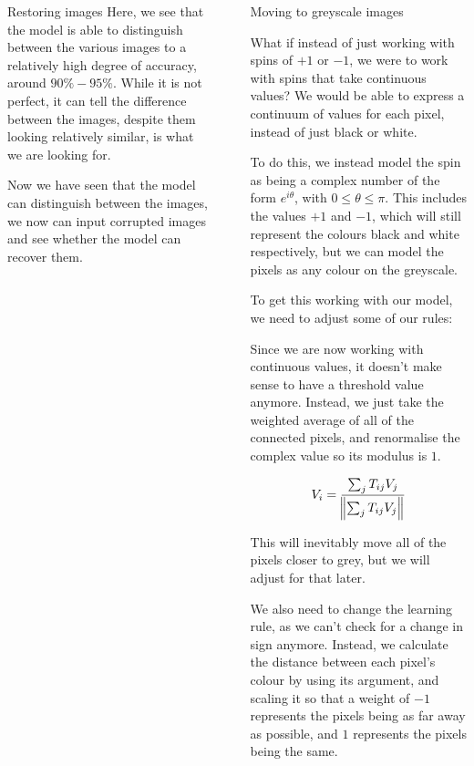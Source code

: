 \documentclass[25pt, a0paper, portrait]{beamer}
\newlength{\sepwidth}
\newlength{\colwidth}
\newcommand{\separatorcolumn}{\begin{column}{\sepwidth}\end{column}}
\begin{document}
\begin{frame}[t]
\begin{columns}[t]
\begin{column}{\colwidth}
\begin{block}{Restoring images}
    Here, we see that the model is able to distinguish between the various images to
    a relatively high degree of accuracy, around $90\% - 95\%$. While it is not perfect, it
    can tell the difference between the images, despite them looking relatively similar,
    is what we are looking for.

    Now we have seen that the model can distinguish between the images, we now can
    input corrupted images and see whether the model can recover them.

  \end{block}

\end{column}

\separatorcolumn

\begin{column}{\colwidth}

  \begin{block}{Moving to greyscale images} \small

    What if instead of just working with spins of $+1$ or $-1$, we were to work
    with spins that take continuous values? We would be able to express a continuum
    of values for each pixel, instead of just black or white.

    To do this, we instead model the spin as being a complex number of the form $e^{i\theta}$,
    with $0 \le \theta \le \pi$. This includes the values $+1$ and $-1$, which will still
    represent the colours black and white respectively, but we can model the pixels
    as any colour on the greyscale.

    To get this working with our model, we need to adjust some of our rules:


    Since we are now working with continuous values, it doesn't make sense to have a threshold
    value anymore. Instead, we just take the weighted average of all of the connected pixels,
    and renormalise the complex value so its modulus is $1$.

    \begin{equation} \label{complex_update_rule}
      V_i = \frac{\sum_{j}T_{ij}V_j}{\norm{\sum_{j}T_{ij}V_j}}
    \end{equation}

    This will inevitably move all of the pixels closer to grey, but we will adjust for that later.


    We also need to change the learning rule, as we can't check for a change in sign anymore.
    Instead, we calculate the distance between each pixel's colour by using its argument, and
    scaling it so that a weight of $-1$ represents the pixels being as far away as possible,
    and $1$ represents the pixels being the same.


\end{block}
\end{column}
\end{columns}
\end{frame}
\end{document}
